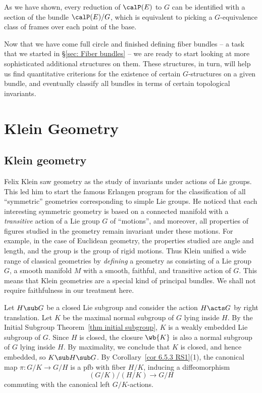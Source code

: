 As we have shown, every reduction of $\calP(E)$ to $G$ can be identified with a section of the bundle $\calP(E)\slash G$, which is equivalent to picking a $G$-equivalence class of frames over each point of the base.


Now that we have come full circle and finished defining fiber bundles -- a task that we started in \S\ref{sec: Fiber bundles} -- we are ready to start looking at more sophisticated additional structures on them. These structures, in turn, will help us find quantitative criterions for the existence of certain $G$-structures on a given bundle, and eventually classify all bundles in terms of certain topological invariants.











\clearpage
\section{Klein Geometry}

\subsection{Klein geometry}

Felix Klein saw geometry as the study of invariants under actions of Lie groups. This led him to start the famous Erlangen program for the classification of all ``symmetric'' geometries corresponding to simple Lie groups. He noticed that each interesting symmetric geometry is based on a connected manifold with a \emph{transitive} action of a Lie group $G$ of ``motions'', and moreover, all properties of figures studied in the geometry remain invariant under these motions. For example, in the case of Euclidean geometry, the properties studied are angle and length, and the group is the group of rigid motions. Thus Klein unified a wide range of classical geometries by \emph{defining} a geometry as consisting of a Lie group $G$, a smooth manifold $M$ with a smooth, faithful, and transitive action of $G$. This means that Klein geometries are a special kind of principal bundles. We shall not require faithfulness in our treatment here.

Let $H\sub G$ be a closed Lie subgroup and consider the action $H\acts G$ by right translation. Let $K$ be the maximal normal subgroup of $G$ lying inside $H$. By the Initial Subgroup Theorem~\ref{thm initial subgroup}, $K$ is a weakly embedded Lie subgroup of $G$. Since $H$ is closed, the closure $\wb{K}$ is also a normal subgroup of $G$ lying inside $H$. By maximality, we conclude that $K$ is closed, and hence embedded, so $K\sub H\sub G$. By Corollary~\ref{cor 6.5.3 RS1}(1), the canonical map $\pi:G\slash K\to G\slash H$ is a \gls{pfb} with fiber $H\slash K$, inducing a diffeomorphism
\[(G\slash K)\slash (H\slash K)\to G\slash H\]
commuting with the canonical left $G\slash K$-actions.

